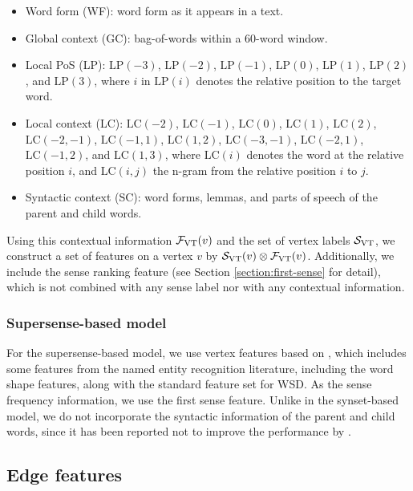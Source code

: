 \documentclass[english]{jnlp_1.4}
\begin{document}
\begin{itemize}
\item
Word form (WF):
word form as it appears in a text.
\item
Global context (GC):
bag-of-words within a 60-word window.
\item
Local PoS (LP):
$\mbox{LP}(-3)$, $\mbox{LP}(-2)$, $\mbox{LP}(-1)$, $\mbox{LP}(0)$, $\mbox{LP}(1)$, $\mbox{LP}(2)$, and $\mbox{LP}(3)$,
where $i$ in $\mbox{LP}(i)$ denotes the relative position to the target word.
\item
Local context (LC):
$\mbox{LC}(-2)$, $\mbox{LC}(-1)$, $\mbox{LC}(0)$, $\mbox{LC}(1)$, $\mbox{LC}(2)$,
$\mbox{LC}(-2,-1)$, $\mbox{LC}(-1,1)$, $\mbox{LC}(1,2)$,
$\mbox{LC}(-3,-1)$, $\mbox{LC}(-2,1)$, $\mbox{LC}(-1,2)$, and $\mbox{LC}(1,3)$,
where $\mbox{LC}(i)$ denotes the word at the relative position $i$,
and $\mbox{LC}(i,j)$ the n-gram from the relative position $i$ to $j$.
\item
Syntactic context (SC):
word forms, lemmas, and parts of speech of the parent and child words.
\end{itemize}

Using this contextual information ${\cal F}_{\mathrm{VT}}(v)$ and the set of vertex labels ${\cal S}_{\mathrm{VT}}$, we construct a set of features on a vertex $v$ by ${\cal S}_{\mathrm{VT}}(v) \otimes {\cal F}_{\mathrm{VT}}(v)$.
Additionally, we include the sense ranking feature (see Section \ref{section:first-sense} for detail), which is not combined with any sense label nor with any contextual information.


\subsubsection{Supersense-based model}

For the supersense-based model, we use vertex features based on \cite{ciaramita:2006}, which includes some features from the named entity recognition literature, including the word shape features, along with the standard feature set for WSD.
As the sense frequency information, we use the first sense feature.
Unlike in the synset-based model, we do not incorporate the syntactic information of the parent and child words, since it has been reported not to improve the performance by \cite{ciaramita:2006}.


\subsection{Edge features}
\label{section:edge-features}
\end{document}

